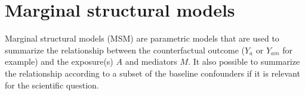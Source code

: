 \documentclass[
]{book}
\newenvironment{Shaded}{\begin{snugshade}}{\end{snugshade}}
\newcommand{\CommentTok}[1]{\textcolor[rgb]{0.56,0.35,0.01}{\textit{#1}}}
\newcommand{\DecValTok}[1]{\textcolor[rgb]{0.00,0.00,0.81}{#1}}
\newcommand{\FunctionTok}[1]{\textcolor[rgb]{0.13,0.29,0.53}{\textbf{#1}}}
\newcommand{\NormalTok}[1]{#1}
\newcommand{\OtherTok}[1]{\textcolor[rgb]{0.56,0.35,0.01}{#1}}
\newcommand{\SpecialCharTok}[1]{\textcolor[rgb]{0.81,0.36,0.00}{\textbf{#1}}}
\begin{document}
\begin{Shaded}
\end{Shaded}

\hypertarget{msm_chapter}{%
\chapter{Marginal structural models}\label{msm_chapter}}

Marginal structural models (MSM) are parametric models that are used to summarize the relationship between the counterfactual outcome (\(Y_a\) or \(Y_{am}\) for example) and the exposure(s) \(A\) and mediators \(M\). It also possible to summarize the relationship according to a subset of the baseline confounders if it is relevant for the scientific question.
\end{document}

